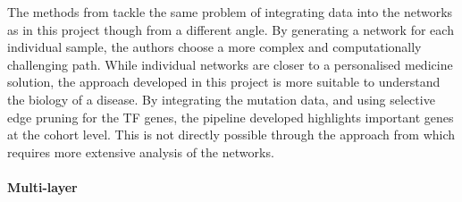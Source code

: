 The methods from \citet{Hofree2013-ld, He2017-dj} tackle the same problem of integrating data into the networks as in this project though from a different angle. By generating a network for each individual sample, the authors choose a more complex and computationally challenging path. While individual networks are closer to a personalised medicine solution, the approach developed in this project is more suitable to understand the biology of a disease. By integrating the mutation data, and using selective edge pruning for the TF genes, the pipeline developed highlights important genes at the cohort level. This is not directly possible through the approach from \citet{Hofree2013-ld, He2017-dj} which requires more extensive analysis of the networks.



\paragraph*{Multi-layer} \label{s:lit:multi-layer}

